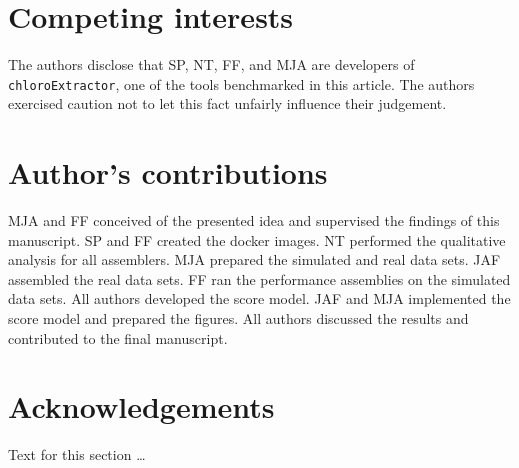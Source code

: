 \documentclass{bmcart}
\newcommand{\formatprogramnames}[1]{\texttt{#1}}
\newcommand{\ce}{\formatprogramnames{chloroExtractor}}
\begin{document}
\begin{backmatter}

\section*{Competing interests}
  The authors disclose that SP, NT, FF, and MJA are developers of \ce{}, one of the tools benchmarked in this article. The authors exercised caution not to let this fact unfairly influence their judgement.

\section*{Author's contributions}
    MJA and FF conceived of the presented idea and supervised the findings of this manuscript.
SP and FF created the docker images.
NT performed the qualitative analysis for all assemblers.
MJA prepared the simulated and real data sets.
JAF assembled the real data sets.
FF ran the performance assemblies on the simulated data sets.
All authors developed the score model.
JAF and MJA implemented the score model and prepared the figures.
All authors discussed the results and contributed to the final manuscript.

\section*{Acknowledgements}
  Text for this section \ldots



\end{backmatter}
\end{document}
